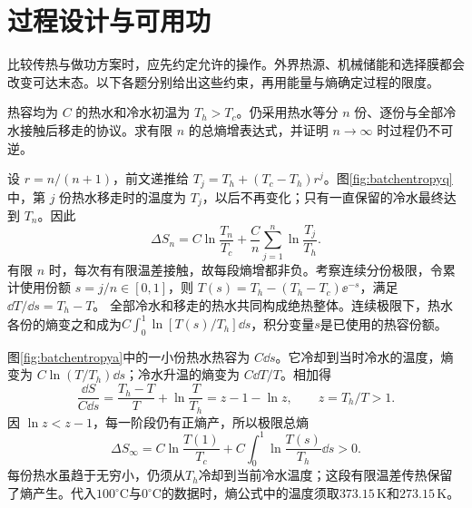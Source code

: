\section{过程设计与可用功}
比较传热与做功方案时，应先约定允许的操作。外界热源、机械储能和选择膜都会改变可达末态。以下各题分别给出这些约束，再用能量与熵确定过程的限度。

\begin{example}[分批接触为何仍有熵产生]
热容均为 $C$ 的热水和冷水初温为 $T_h>T_c$。仍采用热水等分 $n$ 份、逐份与全部冷水接触后移走的协议。求有限 $n$ 的总熵增表达式，并证明 $n\to\infty$ 时过程仍不可逆。
\end{example}
\begin{solution}
设 $r=n/(n+1)$，前文递推给 $T_j=T_h+(T_c-T_h)r^j$。图\ref{fig:batchentropyq}中，第 $j$ 份热水移走时的温度为 $T_j$，以后不再变化；只有一直保留的冷水最终达到 $T_n$。因此
\[
 \Delta S_n=C\ln\frac{T_n}{T_c}
 +\frac Cn\sum_{j=1}^n\ln\frac{T_j}{T_h}.
\]
有限 $n$ 时，每次有有限温差接触，故每段熵增都非负。考察连续分份极限，令累计使用份额 $s=j/n\in[0,1]$，则 $T(s)=T_h-(T_h-T_c)\ee^{-s}$，满足 $\dd T/\dd s=T_h-T$。
全部冷水和移走的热水共同构成绝热整体。连续极限下，热水各份的熵变之和成为$C\int_0^1\ln[T(s)/T_h]\dd s$，积分变量$s$是已使用的热容份额。

图\ref{fig:batchentropya}中的一小份热水热容为 $C\dd s$。它冷却到当时冷水的温度，熵变为 $C\ln(T/T_h)\dd s$；冷水升温的熵变为 $C\dd T/T$。相加得
\[
 \frac{\dd S}{C\dd s}=\frac{T_h-T}{T}+\ln\frac T{T_h}
 =z-1-\ln z,\qquad z=T_h/T>1.
\]
因 $\ln z<z-1$，每一阶段仍有正熵产，所以极限总熵
\[
 \Delta S_\infty=C\ln\frac{T(1)}{T_c}
 +C\int_0^1\ln\frac{T(s)}{T_h}\dd s>0.
\]
每份热水虽趋于无穷小，仍须从$T_h$冷却到当前冷水温度；这段有限温差传热保留了熵产生。代入$100^\circ\mathrm C$与$0^\circ\mathrm C$的数据时，熵公式中的温度须取$373.15\,\mathrm K$和$273.15\,\mathrm K$。
\end{solution}

